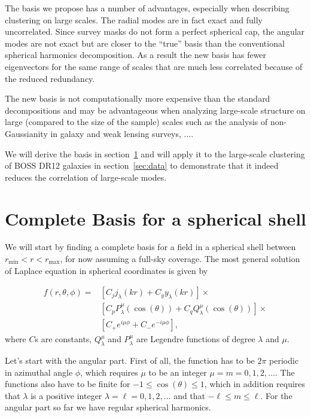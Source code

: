 \documentclass[fleqn,usenatbib]{mnras}
\newcommand{\rmin}{r_\mathrm{min}}
\newcommand{\rmax}{r_\mathrm{max}}
\begin{document}
The basis we propose has a number of advantages, especially when describing
clustering on large scales. The radial modes are in fact exact and fully
uncorrelated. Since survey masks do not form a perfect spherical cap, the
angular modes are not exact but are closer to the ``true'' basis than the
conventional spherical harmonics decomposition. As a result the new basis has
fewer eigenvectors for the same range of scales that are much less correlated
because of the reduced redundancy.

The new basis is not computationally more expensive than the standard
decompositions and may be advantageous when analyzing large-scale structure on
large (compared to the size of the sample) scales such as the analysis of non-
Gaussianity in galaxy and weak lensing surveys, $\ldots$.

We will derive the basis in section~\ref{sec:basis} and will apply it to the
large-scale clustering of BOSS DR12 galaxies in section~\ref{sec:data} to
demonstrate that it indeed reduces the correlation of large-scale modes.
\section{Complete Basis for a spherical shell}
\label{sec:basis}

We will start by finding a complete basis for a field in a spherical shell
between $\rmin < r < \rmax$, for now assuming a full-sky
coverage. The most general solution of Laplace equation in spherical coordinates
is given by

\begin{align} 
\label{eq:generalsol}
f(r,\theta,\phi) = &\left[C_jj_\lambda(kr) + C_yy_\lambda(kr)\right]\times\\
\nonumber
&\left [C_pP^\mu_\lambda (\cos (\theta)) + C_qQ^\mu_\lambda(\cos
(\theta))\right]\times\\
\nonumber
&\left[C_+e^{i\mu\phi} + C_-e^ {-i\mu\phi}\right],
\end{align} 
\noindent
where $C$s are constants, $Q^\mu_\lambda$ and $P^\mu_\lambda$ are Legendre
functions of degree $\lambda$ and $\mu$. 

Let's start with the angular part. First of all, the function has to be $2\pi$
periodic in azimuthal angle $\phi$, which requires $\mu$ to be an integer $\mu =
m = 0, 1, 2, \ldots$. The functions also have to be finite for $-1 \leq
\cos(\theta) \leq 1$, which in addition requires that $\lambda$ is a positive
integer $\lambda = \ell = 0, 1, 2, \ldots$ and that $-\ell \leq m \leq \ell$.
For the angular part so far we have regular spherical harmonics.
\end{document}
